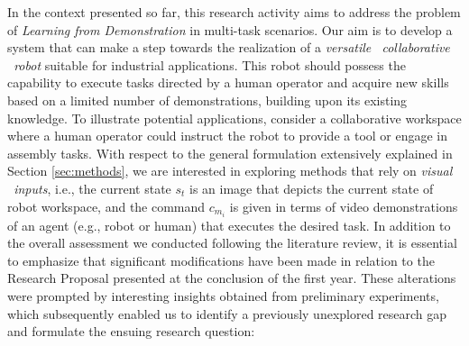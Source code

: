 In the context presented so far, this research activity aims to address the problem of \textit{Learning from Demonstration} in multi-task scenarios. Our aim is to develop a system that can make a step towards the realization of a \textit{versatile \ collaborative \ robot} suitable for industrial applications. This robot should possess the capability to execute tasks directed by a human operator and acquire new skills based on a limited number of demonstrations, building upon its existing knowledge. To illustrate potential applications, consider a collaborative workspace where a human operator could instruct the robot to provide a tool or engage in assembly tasks.
\newline With respect to the general formulation extensively explained in Section \ref{sec:methods}, we are interested in exploring methods that rely on \textit{visual \ inputs}, i.e., the current state $s_{t}$ is an image that depicts the current state of robot workspace, and the command $c_{m_{i}}$ is given in terms of video demonstrations of an agent (e.g., robot or human) that executes the desired task.
\newline In addition to the overall assessment we conducted following the literature review, it is essential to emphasize that significant modifications have been made in relation to the Research Proposal presented at the conclusion of the first year. These alterations were prompted by interesting insights obtained from preliminary experiments, which subsequently enabled us to identify a previously unexplored research gap and formulate the ensuing research question:
